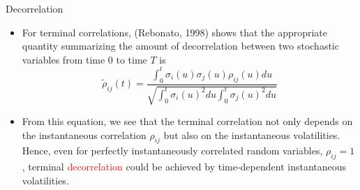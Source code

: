 \documentclass{beamer}
\begin{document}
\begin{frame}{Decorrelation}
	\begin{itemize}
	\item<1-> For terminal correlations, (Rebonato, 1998) shows that the appropriate quantity summarizing the amount of decorrelation between two stochastic variables from time 0 to time $T$ is
	\begin{equation}		
		\tilde{\rho}_{ij}(t)=\frac{\int_0^t\sigma_i(u)\sigma_j(u)\rho_{ij}(u)du}{\sqrt{\int_0^t\sigma_i(u)^2 du\int_0^t\sigma_j(u)^2 du}}	
		\label{eq:terminal_correlation}
	\end{equation}
	\item<2-> From this equation, we see that the terminal correlation not only depends on the instantaneous correlation $\rho_{ij}$ but also on the instantaneous volatilities. Hence, even for perfectly instantaneously correlated random variables, $\rho_{ij}= 1$, terminal \textcolor{red}{decorrelation} could be achieved by time-dependent instantaneous volatilities.
\end{itemize}
\end{frame}	
\end{document}

